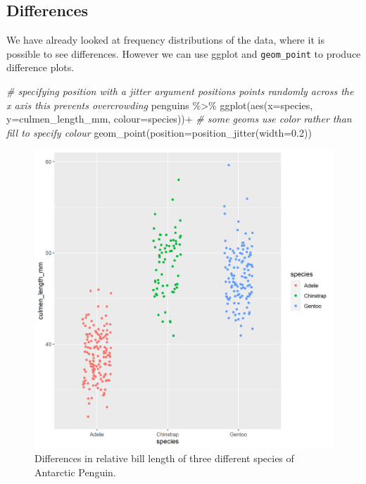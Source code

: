 \documentclass[
]{book}
\newenvironment{Shaded}{\begin{snugshade}}{\end{snugshade}}
\newcommand{\AttributeTok}[1]{\textcolor[rgb]{0.77,0.63,0.00}{#1}}
\newcommand{\CommentTok}[1]{\textcolor[rgb]{0.56,0.35,0.01}{\textit{#1}}}
\newcommand{\FloatTok}[1]{\textcolor[rgb]{0.00,0.00,0.81}{#1}}
\newcommand{\FunctionTok}[1]{\textcolor[rgb]{0.00,0.00,0.00}{#1}}
\newcommand{\NormalTok}[1]{#1}
\newcommand{\SpecialCharTok}[1]{\textcolor[rgb]{0.00,0.00,0.00}{#1}}
\begin{document}
\hypertarget{differences}{%
\subsection{Differences}\label{differences}}

We have already looked at frequency distributions of the data, where it is possible to see differences. However we can use ggplot and \texttt{geom\_point} to produce difference plots.

\begin{Shaded}
\begin{Highlighting}[]
\CommentTok{\# specifying position with a jitter argument positions points randomly across the x axis this prevents overcrowding}
\NormalTok{penguins }\SpecialCharTok{\%\textgreater{}\%} 
    \FunctionTok{ggplot}\NormalTok{(}\FunctionTok{aes}\NormalTok{(}\AttributeTok{x=}\NormalTok{species, }
               \AttributeTok{y=}\NormalTok{culmen\_length\_mm, }
               \AttributeTok{colour=}\NormalTok{species))}\SpecialCharTok{+} \CommentTok{\# some geoms use color rather than fill to specify colour}
    \FunctionTok{geom\_point}\NormalTok{(}\AttributeTok{position=}\FunctionTok{position\_jitter}\NormalTok{(}\AttributeTok{width=}\FloatTok{0.2}\NormalTok{)) }
\end{Highlighting}
\end{Shaded}

\begin{figure}
\includegraphics[width=1\linewidth]{images/jitterplot} \caption{Differences in relative bill length of three different species of Antarctic Penguin.}\label{fig:unnamed-chunk-104}
\end{figure}
\end{document}
